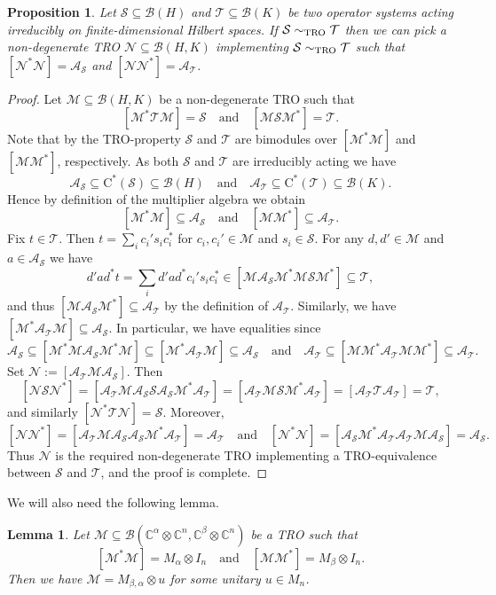 \documentclass[11pt]{amsart}
\numberwithin{equation}{section}
\theoremstyle{plain}
\newtheorem{proposition}[theorem]{Proposition}
\newtheorem{lemma}[theorem]{Lemma}
\theoremstyle{definition}
\theoremstyle{remark}
\newcommand{\A}{{\mathcal{A}}}
\newcommand{\B}{{\mathcal{B}}}
\newcommand{\M}{{\mathcal{M}}}
\newcommand{\N}{{\mathcal{N}}}
\renewcommand{\S}{{\mathcal{S}}}
\newcommand{\T}{{\mathcal{T}}}
\newcommand{\bC}{\mathbb{C}}
\newcommand{\qand}{\quad\text{and}\quad}
\newcommand{\ca}{\mathrm{C}^*}
\begin{document}
\begin{proposition}\label{P:multeq}
Let $\S\subseteq \B(H)$ and $\T\subseteq \B(K)$  be two operator systems acting irreducibly on finite-dimensional Hilbert spaces. If $\S \sim_{\rm TRO}\T$ then we can pick a non-degenerate TRO $\N\subseteq \B(H,K)$ implementing $\S \sim_{\rm TRO}\T$ such that $[\N^* \N]= \A_\S$ and $[\N\N^*] = \A_\T$.
\end{proposition}

\begin{proof}
Let $\M\subseteq \B(H,K)$ be a non-degenerate TRO such that
\[
[\M^* \T \M] = \S
\qand
[\M \S \M^*] = \T.
\]
Note that by the TRO-property $\S$ and $\T$ are bimodules over $[\M^*\M]$ and $[\M \M^*]$, respectively. As both $\S$ and $\T$ are irreducibly acting we have 
\[
\A_\S \subseteq \ca(\S) \subseteq \B(H) \qand \A_\T \subseteq \ca(\T) \subseteq \B(K).
\]
Hence by definition of the multiplier algebra we obtain
\[
[\M^*\M]\subseteq \A_\S \qand [\M \M^*] \subseteq \A_\T.
\]
Fix $t\in \T$. Then $t= \sum_i c_i' s_i c_i^*$ for $c_i,c_i'\in \M$ and $s_i \in \S$. For any $d , d' \in \M$ and $a\in \A_\S$ we have
\[
d' a d^* t=  \sum_i d' a d^*   c_i' s_i c_i^*\in [\M \A_\S \M^* \M \S \M^*] \subseteq \T,
\]
and thus $[\M \A_\S \M^*] \subseteq \A_\T$ by the definition of $\A_\T$. Similarly, we have $[\M^* \A_\T \M] \subseteq \A_\S$. In particular, we have equalities since 
\[
\A_\S \subseteq [\M^* \M \A_\S \M^* \M] \subseteq [\M^* \A_\T \M] \subseteq \A_\S \qand \A_\T \subseteq  [\M \M^* \A_\T \M \M^*]  \subseteq \A_\T.
\]
Set $\N:=[\A_\T \M \A_\S]$. Then 
\[
[\N \S \N^*]=[\A_\T \M \A_\S \S \A_\S \M^* \A_\T]= [\A_\T \M \S \M^* \A_\T]= [\A_\T \T \A_\T]=\T,
\]
and similarly $[\N^* \T \N] = \S$. Moreover,
\[
[\N \N^*] = [\A_\T \M \A_\S \A_\S \M^* \A_\T] =\A_\T \qand [\N^* \N]=[\A_\S \M^* \A_\T \A_\T \M \A_\S]=\A_\S.
\]
Thus $\N$ is the required non-degenerate TRO implementing a TRO-equivalence between $\S$ and $\T$, and the proof is complete.
\end{proof}

We will also need the following lemma.

\begin{lemma} \label{L:unitary}
Let $\M\subseteq \B(\bC^\alpha\otimes\bC^n,\bC^\beta\otimes \bC^n)$ be a TRO such that 
\[
[\M^*\M]=M_\alpha\otimes I_n \qand [\M\M^*]=M_\beta\otimes I_n.
\]
Then we have  $\M=M_{\beta,\alpha}\otimes u$ for some unitary $u\in M_n$.
\end{lemma}
\end{document}
